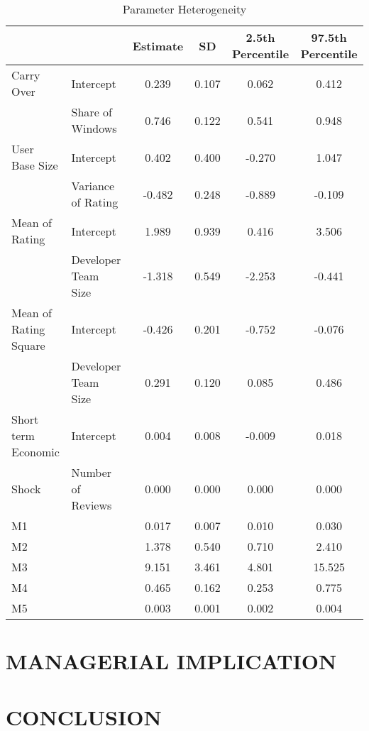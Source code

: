 \documentclass[mksc,nonblindrev]{informs3}
\begin{document}
\begin{table}
	\centering
		\begin{tabular}{llcccc}\hline \hline
			&		&	Estimate	&	SD	& 	2.5th Percentile	&	97.5th 
Percentile	\\ \hline 
			Carry Over	&	Intercept	&	0.239	&	0.107	&	0.062	&	0.412	\\ 
				&	Share of Windows	&	0.746	&	0.122	&	0.541	&	0.948	\\
			User Base Size	&	Intercept	&	0.402	&	0.400	&	-0.270	&	1.047	\\
				&	Variance of Rating	&	-0.482	&	0.248	&	-0.889	&	-0.109	\\
			Mean of Rating	&	Intercept	&	1.989	&	0.939	&	0.416	&	3.506	\\
				&	Developer Team Size	&	-1.318	&	0.549	&	-2.253	&	-0.441	\\
			Mean of Rating Square	&	Intercept	&	-0.426	&	0.201	&	-0.752	&	-0.076	\\
				&	Developer Team Size	&	0.291	&	0.120	&	0.085	&	0.486	\\
			Short term Economic	&	Intercept	&	0.004	&	0.008	&	-0.009	&	0.018	\\
				Shock &	Number of Reviews	&	0.000	&	0.000	&	0.000	&	0.000	\\
			M1	&		&	0.017	&	0.007	&	0.010	&	0.030	\\
			M2	&		&	1.378	&	0.540	&	0.710	&	2.410	\\
			M3	&		&	9.151	&	3.461	&	4.801	&	15.525	\\
			M4	&		&	0.465	&	0.162	&	0.253	&	0.775	\\
			M5	&		&	0.003	&	0.001	&	0.002	&	0.004	\\ \hline
		\end{tabular}
	\caption{Parameter Heterogeneity}
	\label{tab:PrmHetgnty}
\end{table}









\section{MANAGERIAL IMPLICATION}\label{Mimplication} %



\section{CONCLUSION}\label{Concl} %
\end{document}
